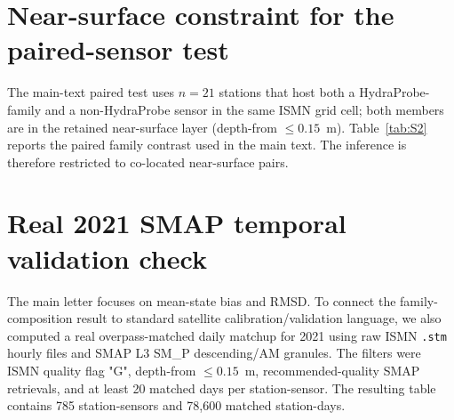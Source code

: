\documentclass[11pt]{article}
\begin{document}
\section{Near-surface constraint for the paired-sensor test}
The main-text paired test uses $n=21$ stations that host both a
HydraProbe-family and a non-HydraProbe sensor in the same ISMN grid
cell; both members are in the retained near-surface layer
(depth-from $\le0.15$~m). Table~\ref{tab:S2} reports the paired
family contrast used in the main text. The inference is therefore
restricted to co-located near-surface pairs.

\begin{table}[h!]
\centering
\caption{Paired-sensor offset (non-HydraProbe $-$ HydraProbe) for
co-located near-surface pairs.}
\label{tab:S2}
\small
{}
\end{table}

\section{Real 2021 SMAP temporal validation check}
The main letter focuses on mean-state bias and RMSD. To connect the
family-composition result to standard satellite calibration/validation
language, we also computed a real overpass-matched daily matchup for
2021 using raw ISMN \texttt{.stm} hourly files and SMAP L3 SM\_P
descending/AM granules. The filters were ISMN quality flag "G",
depth-from $\le0.15$~m, recommended-quality SMAP retrievals, and at
least 20 matched days per station-sensor. The resulting table contains
785 station-sensors and 78{,}600 matched station-days.
\end{document}
